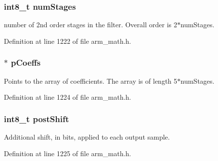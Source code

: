 \subsubsection[{\texorpdfstring{num\+Stages}{numStages}}]{\setlength{\rightskip}{0pt plus 5cm}int8\+\_\+t num\+Stages}\hypertarget{structarm__biquad__casd__df1__inst__q15_af59c4ceb94f92d6613492b37e7c949de}{}\label{structarm__biquad__casd__df1__inst__q15_af59c4ceb94f92d6613492b37e7c949de}
number of 2nd order stages in the filter. Overall order is 2$\ast$num\+Stages. 

Definition at line 1222 of file arm\+\_\+math.\+h.

\subsubsection[{\texorpdfstring{p\+Coeffs}{pCoeffs}}]{$\ast$ p\+Coeffs}\hypertarget{structarm__biquad__casd__df1__inst__q15_a7ca181a37f714d174445f486bebce26f}{}\label{structarm__biquad__casd__df1__inst__q15_a7ca181a37f714d174445f486bebce26f}
Points to the array of coefficients. The array is of length 5$\ast$num\+Stages. 

Definition at line 1224 of file arm\+\_\+math.\+h.

\subsubsection[{\texorpdfstring{post\+Shift}{postShift}}]{\setlength{\rightskip}{0pt plus 5cm}int8\+\_\+t post\+Shift}\hypertarget{structarm__biquad__casd__df1__inst__q15_a3603cbf084938b6931bcb05dfe487f09}{}\label{structarm__biquad__casd__df1__inst__q15_a3603cbf084938b6931bcb05dfe487f09}
Additional shift, in bits, applied to each output sample. 

Definition at line 1225 of file arm\+\_\+math.\+h.

